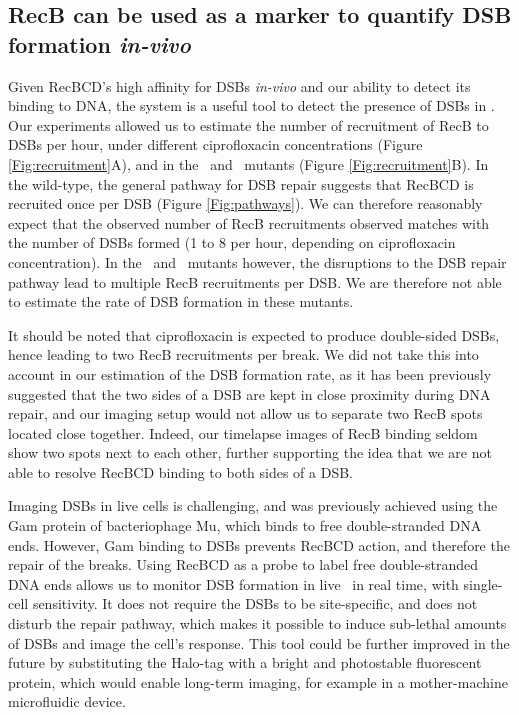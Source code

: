 \subsection*{RecB can be used as a marker to quantify DSB formation \emph{in-vivo}}
Given RecBCD's high affinity for DSBs \emph{in-vivo} and our ability to detect its binding to DNA, the system is a useful tool to detect the presence of DSBs in \ecoli. Our experiments allowed us to estimate the number of recruitment of RecB to DSBs per hour, under different ciprofloxacin concentrations (Figure \ref{Fig:recruitment}A), and in the \dreca\ and \geneteneighty\ mutants (Figure \ref{Fig:recruitment}B). In the wild-type, the general pathway for DSB repair suggests that RecBCD is recruited once per DSB (Figure \ref{Fig:pathways}). We can therefore reasonably expect that the observed number of RecB recruitments observed matches with the number of DSBs formed (1 to 8 per hour, depending on ciprofloxacin concentration). In the \dreca\ and \geneteneighty\ mutants however, the disruptions to the DSB repair pathway lead to multiple RecB recruitments per DSB. We are therefore not able to estimate the rate of DSB formation in these mutants.

It should be noted that ciprofloxacin is expected to produce double-sided DSBs, hence leading to two RecB recruitments per break. We did not take this into account in our estimation of the DSB formation rate, as it has been previously suggested that the two sides of a DSB are kept in close proximity during DNA repair\cite{Vickridge2017,Keyamura2019}, and our imaging setup would not allow us to separate two RecB spots located close together. Indeed, our timelapse images of RecB binding seldom show two spots next to each other, further supporting the idea that we are not able to resolve RecBCD binding to both sides of a DSB.

Imaging DSBs in live cells is challenging, and was previously achieved using the Gam protein of bacteriophage Mu, which binds to free double-stranded DNA ends\cite{Shee2013}. However, Gam binding to DSBs prevents RecBCD action, and therefore the repair of the breaks. Using RecBCD as a probe to label free double-stranded DNA ends allows us to monitor DSB formation in live \ecoli\ in real time, with single-cell sensitivity. It does not require the DSBs to be site-specific, and does not disturb the repair pathway, which makes it possible to induce sub-lethal amounts of DSBs and image the cell's response. This tool could be further improved in the future by substituting the Halo-tag with a bright and photostable fluorescent protein, which would enable long-term imaging, for example in a mother-machine microfluidic device.

